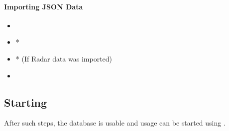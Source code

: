 \paragraph{Importing JSON Data} 

\begin{itemize}
 \item {}
 \item {}*
 \item {}* (If Radar data was imported)
 \item {}
\end{itemize}

\subsection{Starting}
After such steps, the database is usable and usage can be started using .
